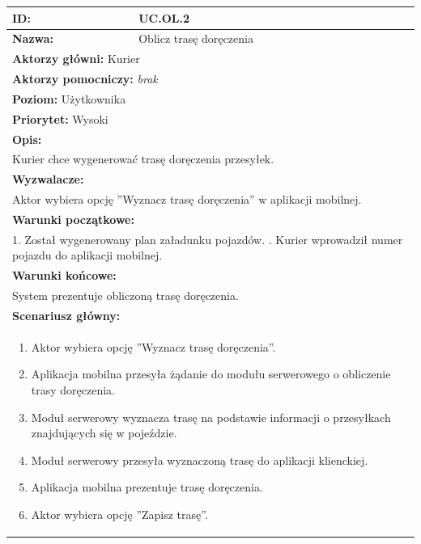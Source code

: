 \begin{center}
\begin{longtable}[h]{|p{1.6cm}|p{13.5cm}|}
\hline
\textbf{ID:} & UC.OL.2 \\ \hline
\textbf{Nazwa:} & Oblicz trasę doręczenia \\ \hline
\multicolumn{2}{|p{15.1cm}|}{\textbf{Aktorzy główni:} Kurier} \\
\multicolumn{2}{|p{15.1cm}|}{\textbf{Aktorzy pomocniczy:} \textit{brak}} \\
\multicolumn{2}{|p{15.1cm}|}{\textbf{Poziom:} Użytkownika} \\
\multicolumn{2}{|p{15.1cm}|}{\textbf{Priorytet:} Wysoki} \\
\hline
\multicolumn{2}{|p{15.1cm}|}{\textbf{Opis:}} \\
\multicolumn{2}{|p{15.1cm}|}{
Kurier chce wygenerować trasę doręczenia przesyłek.
} \\ \hline
\multicolumn{2}{|p{15.1cm}|}{\textbf{Wyzwalacze:}} \\
\multicolumn{2}{|p{15.1cm}|}{
Aktor wybiera opcję ''Wyznacz trasę doręczenia'' w aplikacji mobilnej.
} \\ \hline
\multicolumn{2}{|p{15.1cm}|}{\textbf{Warunki początkowe:}} \\
\multicolumn{2}{|p{15.1cm}|}{
1. Został wygenerowany plan załadunku pojazdów. \newline
2. Kurier wprowadził numer pojazdu do aplikacji mobilnej.
} \\ \hline
\multicolumn{2}{|p{15.1cm}|}{\textbf{Warunki końcowe:}} \\
\multicolumn{2}{|p{15.1cm}|}{
System prezentuje obliczoną trasę doręczenia.
} \\ \hline
\multicolumn{2}{|p{15.1cm}|}{\textbf{Scenariusz główny:}} \\
\multicolumn{2}{|p{15.1cm}|}{
\begin{enumerate}
\item Aktor wybiera opcję ''Wyznacz trasę doręczenia''.
\item Aplikacja mobilna przesyła żądanie do modułu serwerowego o obliczenie trasy doręczenia.
\item Moduł serwerowy wyznacza trasę na podstawie informacji o przesyłkach znajdujących się w pojeździe.
\item Moduł serwerowy przesyła wyznaczoną trasę do aplikacji klienckiej.
\item Aplikacja mobilna prezentuje trasę doręczenia.
\item Aktor wybiera opcję ''Zapisz trasę''.

\end{enumerate}}
\end{longtable}
\end{center}
